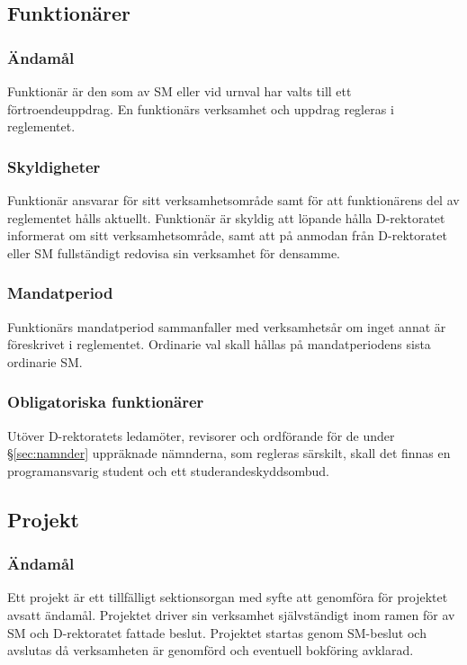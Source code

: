 \documentclass{dgovdoc}
\begin{document}
\subsection{Funktionärer}

\subsubsection{Ändamål}

Funktionär är den som av SM eller vid urnval har valts till ett
förtroendeuppdrag. En funktionärs verksamhet och uppdrag regleras i
reglementet.

\subsubsection{Skyldigheter}

Funktionär ansvarar för sitt verksamhetsområde samt för att funktionärens del
av reglementet hålls aktuellt. Funktionär är skyldig att löpande hålla
D-rektoratet informerat om sitt verksamhetsområde, samt att på anmodan från
D-rektoratet eller SM fullständigt redovisa sin verksamhet för densamme.

\subsubsection{Mandatperiod}

Funktionärs mandatperiod sammanfaller med verksamhetsår om inget annat är
föreskrivet i reglementet. Ordinarie val skall hållas på mandatperiodens sista
ordinarie SM.

\subsubsection{Obligatoriska funktionärer}

Utöver D-rektoratets ledamöter, revisorer och ordförande för de under
\S\ref{sec:namnder} uppräknade nämnderna, som regleras särskilt, skall det
finnas en programansvarig student och ett studerandeskyddsombud.

\subsection{Projekt}

\subsubsection{Ändamål}

Ett projekt är ett tillfälligt sektionsorgan med syfte att genomföra för
projektet avsatt ändamål. Projektet driver sin verksamhet självständigt inom
ramen för av SM och D-rektoratet fattade beslut. Projektet startas genom
SM-beslut och avslutas då verksamheten är genomförd och eventuell bokföring
avklarad.
\end{document}
